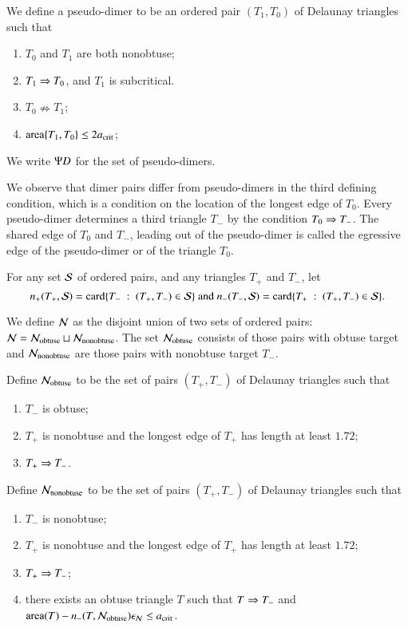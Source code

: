 \begin{definition}
  We define a pseudo-dimer to be an ordered pair $(T_1,T_0)$ of
  Delaunay triangles such that
\begin{enumerate}
\item $T_0$ and $T_1$ are both nonobtuse;
\item $T_1\Ra T_0$, and  $T_1$ is subcritical.
\item $T_0 \nRightarrow T_1$;
\item $\area\{T_1,T_0\} \le 2\acrit$;
\end{enumerate}
We write $\PD$ for the set of pseudo-dimers.
\end{definition}

We observe that dimer pairs differ from pseudo-dimers in the third
defining condition, which is a condition on the location of the
longest edge of $T_0$.  Every pseudo-dimer determines a third triangle
$T_-$ by the condition $T_0\Ra T_-$.  The shared edge of $T_0$ and
$T_-$, leading out of the pseudo-dimer is called the egressive edge of
the pseudo-dimer or of the triangle $T_0$.

For any set $\S$ of ordered pairs, and any triangles $T_+$ and $T_-$,
let 
\[
n_+(T_+,\S) = \card \{T_-\mid (T_+,T_-)\in \S\}\text{ and }
n_-(T_-,\S)
= \card \{T_+\mid (T_+,T_-)\in \S\}.
\]

We define $\N$ as the disjoint union of two sets of ordered pairs: $\N
= \N_{\text{obtuse}} \sqcup \N_{\text{nonobtuse}}$.  The set
$\N_{\text{obtuse}}$ consists of those pairs with obtuse target and
$\N_{\text{nonobtuse}}$ are those pairs with nonobtuse target $T_-$.

Define $\N_{\text{obtuse}}$ to be the set of pairs $(T_+,T_-)$ of
Delaunay triangles such that
\begin{enumerate}
\item $T_-$ is obtuse;
\item $T_+$ is nonobtuse and the longest edge of $T_+$ has length at
  least $1.72$;
\item $T_+\Ra T_-$.
\end{enumerate}

Define  $\N_{\text{nonobtuse}}$ to 
be the set of pairs $(T_+,T_-)$ of Delaunay triangles such that
\begin{enumerate}
\item $T_-$ is nonobtuse;
\item $T_+$ is nonobtuse and the longest edge of $T_+$ has length at
  least $1.72$;
\item $T_+\Ra T_-$;
\item there exists an obtuse triangle $T$ such that $T\Ra T_-$ and 
$\area(T) -   n_-(T,\N_{\text{obtuse}})\epsN\le \acrit$.
\end{enumerate}

